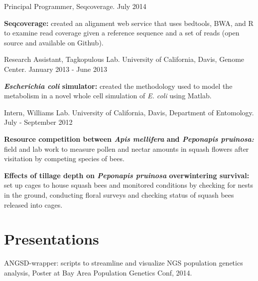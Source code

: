 \documentclass[letterpaper]{article}
\renewenvironment{itemize}{
  \begin{list}{}{
    \setlength{\leftmargin}{1.5em}
  }
}{
  \end{list}
}
\begin{document}
\begin{itemize}
\begin{itemize}
	\end{itemize}
\item Principal Programmer, Seqcoverage. \hfill July 2014
	\begin{itemize}
	\item \textbf{Seqcoverage:} created an alignment web service that uses bedtools, BWA, and R to examine read coverage given a reference sequence and a set of reads (open source and available on Github).
	\end{itemize}
\item Research Assistant, Tagkopulous Lab. University of California, Davis, Genome Center. \hfill January 2013 - June 2013
	\begin{itemize}
	\item \textbf{\textit{Escherichia coli} simulator:} created the methodology used to model the metabolism in a novel whole cell simulation of \textit{E. coli} using Matlab.
	\end{itemize}
\item Intern, Williams Lab. University of California, Davis, Department of Entomology. \hfill July - September 2012
	\begin{itemize}
	\item \textbf{Resource competition between \textit{Apis mellifera} and \textit{Peponapis pruinosa:}} field and lab work to measure pollen and nectar amounts in squash flowers after visitation by competing species of bees.
	\item \textbf{Effects of tillage depth on \textit{Peponapis pruinosa} overwintering survival:} set up cages to house squash bees and monitored conditions by checking for nests in the ground, conducting floral surveys and checking status of squash bees released into cages.
	\end{itemize}
\end{itemize}

\section*{Presentations}
\begin{itemize}
\item ANGSD-wrapper: scripts to streamline and visualize NGS population genetics analysis, Poster at Bay Area Population Genetics Conf, 2014.
\end{itemize}

\end{document}
